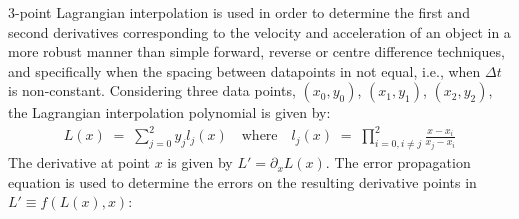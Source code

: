 \documentclass[namedreferences]{SolarPhysics}
\begin{document}
\begin{article}
3-point Lagrangian interpolation is used in order to determine the first and second derivatives corresponding to the velocity and acceleration of an object in a more robust manner than simple forward, reverse or centre difference techniques, and specifically when the spacing between datapoints in not equal, i.e., when $\Delta t$ is non-constant. Considering three data points, $(x_0, y_0)$, $(x_1, y_1)$, $(x_2, y_2)$, the Lagrangian interpolation polynomial is given by:
\begin{eqnarray}
L(x) \; =\; \sum_{j=0}^2 y_j l_j(x) \quad \mbox{where} \quad
l_j(x) \; =\; \prod_{i=0, i\neq j}^2 \frac{x-x_i}{x_j-x_i} 
\end{eqnarray}
The derivative at point $x$ is given by $L'=\partial_x L(x)$. %
The error propagation equation is used to determine the errors on the resulting derivative points in $L' \equiv f(L(x),x)$:

\end{article}
\end{document}
